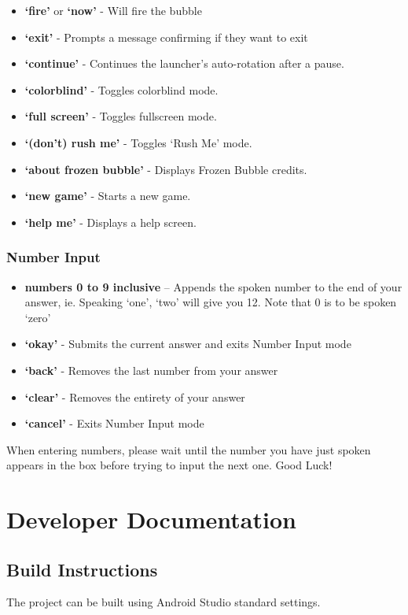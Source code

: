 \documentclass[11pt, oneside]{article}
\begin{document}
\begin{itemize}
	\item {\bf`fire'} or {\bf`now'} - Will fire the bubble
	\item {\bf`exit'} - Prompts a message confirming if they want to exit
	\item {\bf`continue'} - Continues the launcher's auto-rotation after a pause.
	\item {\bf`colorblind'} - Toggles colorblind mode.
	\item {\bf`full screen'} - Toggles fullscreen mode.
	\item {\bf`(don't) rush me'} - Toggles `Rush Me' mode.
	\item {\bf`about frozen bubble'} - Displays Frozen Bubble credits.
	\item {\bf`new game'} - Starts a new game.
	\item {\bf`help me'} - Displays a help screen.
	
\end{itemize}

\subsubsection{Number Input}
\begin{itemize}
  \item {\bf numbers 0 to 9 inclusive} – Appends the spoken number
    to the end of your answer, ie. Speaking `one', `two' will give you
    12. Note that 0 is to be spoken `zero'
  \item {\bf `okay'} - Submits the current answer and exits Number
    Input mode
  \item {\bf `back'} - Removes the last number from your answer
  \item {\bf `clear'} - Removes the entirety of your answer
  \item {\bf `cancel'} - Exits Number Input mode
\end{itemize}

When entering numbers, please wait until the number you have just spoken appears
in the box before trying to input the next one.
Good Luck!

\pagebreak

\section{Developer Documentation}

\subsection{Build Instructions}
The project can be built using Android Studio standard settings.
\end{document}
